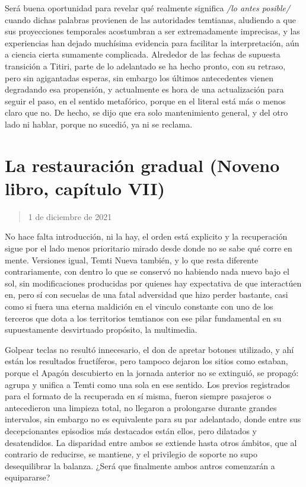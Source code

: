 \documentclass[
  spanish,
]{book}
\begin{document}
Será buena oportunidad para revelar qué realmente significa \emph{/lo antes posible/} cuando dichas palabras provienen de las autoridades temtianas, aludiendo a que sus proyecciones temporales acostumbran a ser extremadamente imprecisas, y las experiencias han dejado muchísima evidencia para facilitar la interpretación, aún a ciencia cierta sumamente complicada. Alrededor de las fechas de supuesta transición a Titiri, parte de lo adelantado se ha hecho pronto, con su retraso, pero sin agigantadas esperas, sin embargo los últimos antecedentes vienen degradando esa propensión, y actualmente es hora de una actualización para seguir el paso, en el sentido metafórico, porque en el literal está más o menos claro que no. De hecho, se dijo que era solo mantenimiento general, y del otro lado ni hablar, porque no sucedió, ya ni se reclama.

\hypertarget{la-restauraciuxf3n-gradual-noveno-libro-capuxedtulo-vii}{%
\section{La restauración gradual (Noveno libro, capítulo VII)}\label{la-restauraciuxf3n-gradual-noveno-libro-capuxedtulo-vii}}

\begin{quote}
1 de diciembre de 2021
\end{quote}

No hace falta introducción, ni la hay, el orden está explicito y la recuperación sigue por el lado menos prioritario mirado desde donde no se sabe qué corre en mente. Versiones igual, Temti Nueva también, y lo que resta diferente contrariamente, con dentro lo que se conservó no habiendo nada nuevo bajo el sol, sin modificaciones producidas por quienes hay expectativa de que interactúen en, pero sí con secuelas de una fatal adversidad que hizo perder bastante, casi como si fuera una eterna maldición en el vinculo constante con uno de los terceros que dota a los territorios temtianos con ese pilar fundamental en su supuestamente desvirtuado propósito, la multimedia.

Golpear teclas no resultó innecesario, el don de apretar botones utilizado, y ahí están los resultados fructíferos, pero tampoco dejaron los sitios como estaban, porque el Apagón descubierto en la jornada anterior no se extinguió, se propagó: agrupa y unifica a Temti como una sola en ese sentido. Los previos registrados para el formato de la recuperada en sí misma, fueron siempre pasajeros o antecedieron una limpieza total, no llegaron a prolongarse durante grandes intervalos, sin embargo no es equivalente para su par adelantado, donde entre sus decepcionantes episodios más destacados están ellos, pero dilatados y desatendidos. La disparidad entre ambos se extiende hasta otros ámbitos, que al contrario de reducirse, se mantiene, y el privilegio de soporte no supo desequilibrar la balanza. ¿Será que finalmente ambos antros comenzarán a equipararse?
\end{document}
